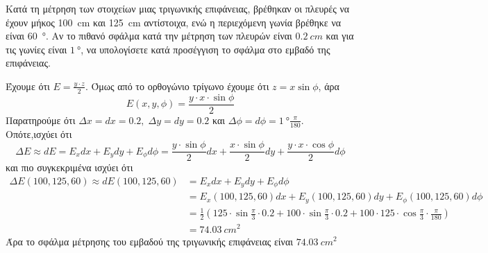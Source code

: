 \begin{example}%
  Κατά τη μέτρηση των στοιχείων μιας τριγωνικής επιφάνειας, βρέθηκαν οι πλευρές να 
  έχουν μήκος \SI{100}{cm} και \SI{125}{cm} αντίστοιχα, ενώ η περιεχόμενη γωνία βρέθηκε 
  να είναι \SI{60}{\degree}. Αν το πιθανό σφάλμα κατά την μέτρηση των πλευρών είναι 
  $ \SI{0.2}{cm} $ και για τις γωνίες είναι $ \SI{1}{\degree} $, να υπολογίσετε κατά 
  προσέγγιση το σφάλμα στο εμβαδό της επιφάνειας.
\end{example}
\begin{solution}
  Έχουμε ότι $ E = \frac{y \cdot z}{2} $. Όμως από το ορθογώνιο τρίγωνο έχουμε ότι 
  $ z = x \sin{\phi} $, άρα 
  \[
    E(x,y,\phi) = \frac{y \cdot x \cdot \sin{\phi}}{2} 
  \] 
  Παρατηρούμε ότι $ \Delta x = dx = 0.2, \; \Delta y = dy = 0.2 $ και 
  $ \Delta \phi = d\phi = \SI{1}{\degree} \frac{\pi}{180} $. Οπότε,ισχύει ότι
  \begin{equation*}
    \Delta E \approx dE = E_{x} dx + E_{y} dy + E_{\phi} d\phi = \frac{y \cdot
    \sin{\phi}}{2} dx + \frac{x \cdot \sin{\phi}}{2} dy + 
    \frac{y \cdot x \cdot \cos{\phi}}{2} d\phi
  \end{equation*} 
  και πιο συγκεκριμένα ισχύει ότι 
  \begin{align*}
    \Delta E(100,125,60) \approx dE(100,125,60) 
  &= E_{x} dx + E_{y} dy + E_{\phi} d\phi \\
  &= E_{x}(100,125,60) dx + E_{y}(100,125,60) dy + E_{\phi}(100,125,60) d\phi \\
  &= \frac{1}{2} \left(125 \cdot \sin{\frac{\pi}{3}} \cdot 0.2 + 100 \cdot
    \sin{\frac{\pi}{3}} \cdot 0.2 + 100 \cdot 125 \cdot \cos{\frac{\pi}{3}} \cdot
  \frac{\pi}{180}\right) \\
  &= \SI{74.03}{cm^{2}}
  \end{align*}
  Άρα το σφάλμα μέτρησης του εμβαδού της τριγωνικής επιφάνειας είναι 
  $ \SI{74.03}{cm^{2}} $
\end{solution}

